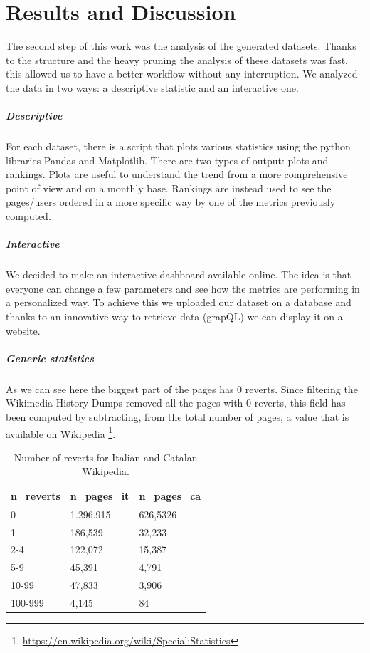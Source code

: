 \chapter{Results and Discussion}

The second step of this work was the analysis of the generated datasets. Thanks to the structure
and the heavy pruning the analysis of these datasets was fast, this allowed us to have a better workflow
without any interruption. We analyzed the data in two ways: a descriptive statistic and an interactive
one.
\paragraph*{Descriptive}
For each dataset, there is a script that plots various statistics using the python libraries
Pandas and Matplotlib. There are two types of output: plots and rankings. 
Plots are useful to understand the trend from a more comprehensive point of view and on a monthly base.  
Rankings are instead used to see the pages/users ordered in a more specific way by one of the
metrics previously computed. 
\paragraph*{Interactive}
We decided to make an interactive dashboard available online. The idea is
that everyone can change a few parameters and see how the metrics are performing in a personalized
way. To achieve this we uploaded our dataset on a database and thanks to an innovative way to retrieve
data (grapQL) we can display it on a website. 

\paragraph*{Generic statistics }
As we can see here the biggest part of the pages has 0 reverts. Since filtering the Wikimedia
History Dumps removed all the pages with 0 reverts, this field has been computed by subtracting, from the
total number of pages, a value that is available on Wikipedia \footnote{\url{https://en.wikipedia.org/wiki/Special:Statistics}}.

\begin{table}[H]
    \centering
    \begin{tabularx}{\columnwidth}{@{}Xll@{}}
        \midrule
        \textbf{n\_reverts} & \textbf{n\_pages\_it} & \textbf{n\_pages\_ca}  \\ \toprule
        0 & 1.296.915& 626,5326\\
        1   & 186,539& 32,233 \\
        2-4 & 122,072& 15,387 \\
        5-9 & 45,391& 4,791 \\
        10-99 & 47,833& 3,906 \\
        100-999 & 4,145& 84\\

        \bottomrule
    \end{tabularx}
    
    \caption{Number of reverts for Italian and Catalan Wikipedia. \label{table:pagesmorechains}}
\end{table}
